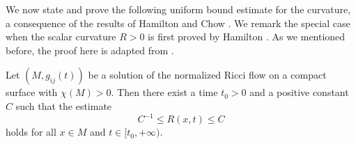 We now state and prove the following uniform bound estimate for
the curvature, a consequence of the results of Hamilton
\cite{Ha88} and Chow \cite{Chow}. We remark the special case when
the scalar curvature $R>0$ is first proved by Hamilton
\cite{Ha88}. As we mentioned before, the proof here is adapted
from \cite{CCZ}.


\begin{proposition} 
  \label{prop:cz-positive-euler-surface-curvature-bounds}

Let $(M,g_{ij}(t))$ be a solution of the normalized Ricci flow on
a compact surface with $\chi(M)>0$. Then there exist a time
$t_0>0$ and a positive constant $C$ such that the estimate
$$
C^{-1}\le R(x,t)\le C
$$
holds for all $x\in M$ and $t\in [t_0,+\infty).$
\end{proposition}

